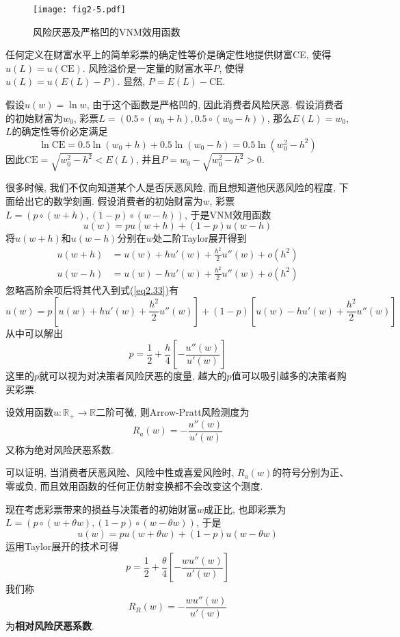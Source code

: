 \documentclass[cn, 12pt, math=mtpro2, bibstyle=apa, blue]{elegantbook}
\newcommand{\R}{\mathbb{R}}
\begin{document}
\begin{figure}[htbp!]
  \centering
  \texttt{[image: fig2-5.pdf]}
  \caption{风险厌恶及严格凹的VNM效用函数}\label{fig2.5}
\end{figure}

\begin{definition}[确定性等价与风险溢价]
任何定义在财富水平上的简单彩票的确定性等价是确定性地提供财富CE, 使得$u(L)=u(\text{CE})$. 风险溢价是一定量的财富水平$P$, 使得$u(L)=u(E(L)-P)$. 显然, $P=E(L)-\text{CE}$.
\end{definition}

\begin{example}
假设$u(w)=\ln w$, 由于这个函数是严格凹的, 因此消费者风险厌恶. 假设消费者的初始财富为$w_0$, 彩票$L=(0.5\circ (w_0+h), 0.5\circ (w_0-h))$, 那么$E(L)=w_0$, $L$的确定性等价必定满足
$$\ln \text{CE}=0.5\ln (w_0+h)+0.5\ln (w_0-h)=0.5\ln (w_0^2-h^2)$$
因此$\text{CE}=\sqrt{w_0^2-h^2}<E(L)$, 并且$P=w_0-\sqrt{w_0^2-h^2}>0$.
\end{example}

很多时候, 我们不仅向知道某个人是否厌恶风险, 而且想知道他厌恶风险的程度, 下面给出它的数学刻画. 假设消费者的初始财富为$w$, 彩票$L=(p\circ (w+h), (1-p)\circ (w-h))$, 于是VNM效用函数
\begin{equation}\label{eq2.33}
  u(w)=pu(w+h)+(1-p)u(w-h)
\end{equation}
将$u(w+h)$和$u(w-h)$分别在$w$处二阶Taylor展开得到
\begin{align*}
u(w+h)&=u(w)+hu'(w)+\frac{h^2}{2}u''(w)+o(h^2) \\
u(w-h)&=u(w)-hu'(w)+\frac{h^2}{2}u''(w)+o(h^2)
\end{align*}
忽略高阶余项后将其代入到式(\ref{eq2.33})有
$$u(w)=p\left[u(w)+hu'(w)+\frac{h^2}{2}u''(w)\right]+(1-p)\left[u(w)-hu'(w)+\frac{h^2}{2}u''(w)\right]$$
从中可以解出
$$p=\frac{1}{2}+\frac{h}{4}\left[-\frac{u''(w)}{u'(w)}\right]$$
这里的$p$就可以视为对决策者风险厌恶的度量, 越大的$p$值可以吸引越多的决策者购买彩票.
\begin{definition}
设效用函数$u:\R_+\to \R$二阶可微, 则Arrow-Pratt风险测度为
$$R_a(w)=-\frac{u''(w)}{u'(w)}$$
又称为绝对风险厌恶系数.
\end{definition}
可以证明, 当消费者厌恶风险、风险中性或喜爱风险时, $R_a(w)$的符号分别为正、零或负, 而且效用函数的任何正仿射变换都不会改变这个测度. 

现在考虑彩票带来的损益与决策者的初始财富$w$成正比, 也即彩票为$L=(p\circ (w+\theta w),(1-p)\circ (w-\theta w))$, 于是
$$u(w)=pu(w+\theta w)+(1-p)u(w-\theta w)$$
运用Taylor展开的技术可得
$$p=\frac{1}{2}+\frac{\theta}{4}\left[-\frac{wu''(w)}{u'(w)}\right]$$
我们称
$$R_R(w)=-\frac{wu''(w)}{u'(w)}$$
为\textbf{相对风险厌恶系数}. 
\end{document}
